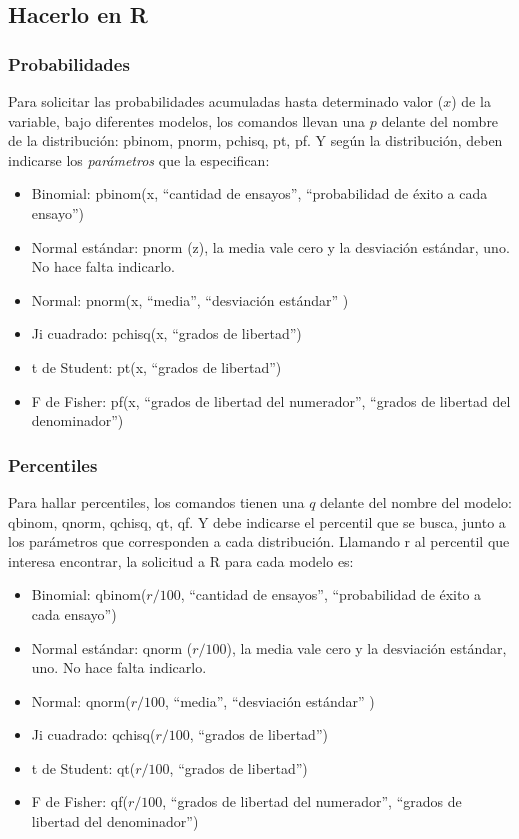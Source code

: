 \documentclass[]{article}
\providecommand{\tightlist}{%
  \setlength{\itemsep}{0pt}\setlength{\parskip}{0pt}}
\begin{document}
\hypertarget{hacerlo-en-r}{%
\subsection{Hacerlo en R}\label{hacerlo-en-r}}

\hypertarget{probabilidades}{%
\subsubsection{Probabilidades}\label{probabilidades}}

Para solicitar las probabilidades acumuladas hasta determinado valor
(\(x\)) de la variable, bajo diferentes modelos, los comandos llevan una
\(p\) delante del nombre de la distribución: pbinom, pnorm, pchisq, pt,
pf. Y según la distribución, deben indicarse los \emph{parámetros} que
la especifican:

\begin{itemize}
\tightlist
\item
  Binomial: pbinom(x, ``cantidad de ensayos'', ``probabilidad de éxito a
  cada ensayo'')
\item
  Normal estándar: pnorm (z), la media vale cero y la desviación
  estándar, uno. No hace falta indicarlo.
\item
  Normal: pnorm(x, ``media'', ``desviación estándar'' )
\item
  Ji cuadrado: pchisq(x, ``grados de libertad'')
\item
  t de Student: pt(x, ``grados de libertad'')
\item
  F de Fisher: pf(x, ``grados de libertad del numerador'', ``grados de
  libertad del denominador'')
\end{itemize}

\hypertarget{percentiles-1}{%
\subsubsection{Percentiles}\label{percentiles-1}}

Para hallar percentiles, los comandos tienen una \(q\) delante del
nombre del modelo: qbinom, qnorm, qchisq, qt, qf. Y debe indicarse el
percentil que se busca, junto a los parámetros que corresponden a cada
distribución. Llamando r al percentil que interesa encontrar, la
solicitud a R para cada modelo es:

\begin{itemize}
\tightlist
\item
  Binomial: qbinom(\(r/100\), ``cantidad de ensayos'', ``probabilidad de
  éxito a cada ensayo'')
\item
  Normal estándar: qnorm (\(r/100\)), la media vale cero y la desviación
  estándar, uno. No hace falta indicarlo.
\item
  Normal: qnorm(\(r/100\), ``media'', ``desviación estándar'' )
\item
  Ji cuadrado: qchisq(\(r/100\), ``grados de libertad'')
\item
  t de Student: qt(\(r/100\), ``grados de libertad'')
\item
  F de Fisher: qf(\(r/100\), ``grados de libertad del numerador'',
  ``grados de libertad del denominador'')
\end{itemize}
\end{document}
